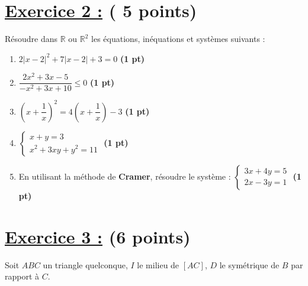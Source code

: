 \documentclass[12pt,a4paper]{article}
\begin{document}
\section*{\underline{Exercice 2 :} ( 5 points) }

Résoudre dans $\mathbb{R}$ ou $\mathbb{R}^{2}$ les équations, inéquations et systèmes suivants :

\begin{enumerate}
    \item $2|x - 2|^2 + 7|x - 2| + 3 = 0$ \hfill \textbf{(1 pt)}
    
    \item $\dfrac{2x^2 + 3x - 5}{-x^2 + 3x + 10} \leq 0$ \hfill \textbf{(1 pt)}
    
    \item $\left(x + \dfrac{1}{x}\right)^2 = 4\left(x + \dfrac{1}{x}\right) - 3$ \hfill \textbf{(1 pt)}
    
    \item $\begin{cases} x + y = 3 \\ x^2 + 3xy + y^2 = 11 \end{cases}$ \hfill \textbf{(1 pt)}
    
    \item En utilisant la méthode de \textbf{Cramer}, résoudre le système : 
    $\begin{cases} 3x + 4y = 5 \\ 2x - 3y = 1 \end{cases}$ \hfill \textbf{(1 pt)}
\end{enumerate}


\newpage
\section*{\underline{Exercice 3 :} (6 points) }

Soit $ABC$ un triangle quelconque, $I$ le milieu de $[AC]$, $D$ le symétrique de $B$ par rapport à $C$.
\end{document}
